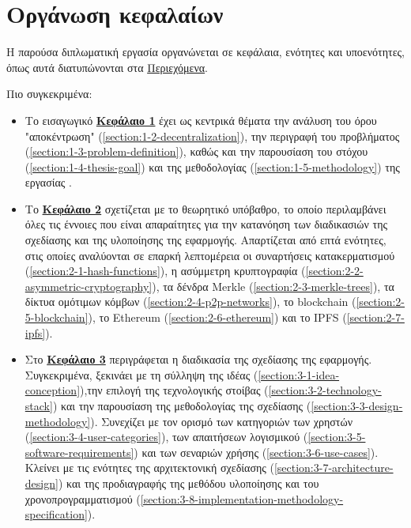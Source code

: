 \section{Οργάνωση κεφαλαίων}\label{section:1-7-document-structure}

Η παρούσα διπλωματική εργασία οργανώνεται σε κεφάλαια, ενότητες και υποενότητες, όπως αυτά διατυπώνονται στα \hyperref[toc]{Περιεχόμενα}.

Πιο συγκεκριμένα:

\begin{itemize}
	\item Το εισαγωγικό \hyperref[chapter:1-introduction]{\textbf{Κεφάλαιο 1}} έχει ως κεντρικά θέματα την ανάλυση του όρου "αποκέντρωση" (\ref{section:1-2-decentralization}), την περιγραφή του προβλήματος (\ref{section:1-3-problem-definition}), καθώς και την παρουσίαση του στόχου (\ref{section:1-4-thesis-goal}) και της μεθοδολογίας (\ref{section:1-5-methodology}) της εργασίας .
	\item Το \hyperref[chapter:2-theoretical-background]{\textbf{Κεφάλαιο 2}} σχετίζεται με το θεωρητικό υπόβαθρο, το οποίο περιλαμβάνει όλες τις έννοιες που είναι απαραίτητες για την κατανόηση των διαδικασιών της σχεδίασης και της υλοποίησης της εφαρμογής. Απαρτίζεται από επτά ενότητες, στις οποίες αναλύονται σε επαρκή λεπτομέρεια οι συναρτήσεις κατακερματισμού (\ref{section:2-1-hash-functions}), η ασύμμετρη κρυπτογραφία (\ref{section:2-2-asymmetric-cryptography}), τα δένδρα Merkle (\ref{section:2-3-merkle-trees}), τα δίκτυα ομότιμων κόμβων (\ref{section:2-4-p2p-networks}), το blockchain (\ref{section:2-5-blockchain}), το Ethereum (\ref{section:2-6-ethereum}) και το IPFS (\ref{section:2-7-ipfs}).
	\item Στο \hyperref[chapter:3-application-design]{\textbf{Κεφάλαιο 3}} περιγράφεται η διαδικασία της σχεδίασης της εφαρμογής. Συγκεκριμένα, ξεκινάει με τη σύλληψη της ιδέας (\ref{section:3-1-idea-conception}),την επιλογή της τεχνολογικής στοίβας (\ref{section:3-2-technology-stack}) και την παρουσίαση της μεθοδολογίας της σχεδίασης (\ref{section:3-3-design-methodology}). Συνεχίζει με τον ορισμό των κατηγοριών των χρηστών (\ref{section:3-4-user-categories}), των απαιτήσεων λογισμικού (\ref{section:3-5-software-requirements}) και των σεναριών χρήσης (\ref{section:3-6-use-cases}). Κλείνει με τις ενότητες της αρχιτεκτονική σχεδίασης (\ref{section:3-7-architecture-design}) και της
	προδιαγραφής της μεθόδου υλοποίησης και του χρονοπρογραμματισμού (\ref{section:3-8-implementation-methodology-specification}).

\end{itemize}
